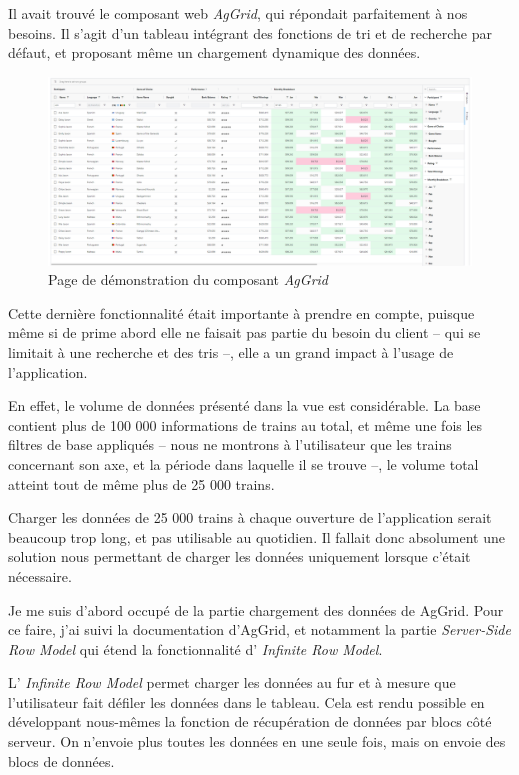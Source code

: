 Il avait trouvé le composant web \textit{AgGrid}\cite{noauthor_ag-grid_nodate-1}, qui répondait parfaitement à nos besoins. Il s'agit d'un tableau intégrant des fonctions de tri et de recherche par défaut, et proposant même un chargement dynamique des données.


  \begin{figure}[H]
    \centering
    \includegraphics[width=1\linewidth]{img/ag-grid-demo.png}
    \caption{Page de démonstration du composant \textit{AgGrid}\cite{noauthor_demo_nodate}}
  \end{figure}

Cette dernière fonctionnalité était importante à prendre en compte, puisque même si de prime abord elle ne faisait pas partie du besoin du client -- qui se limitait à une recherche et des tris --, elle a un grand impact à l'usage de l'application.

En effet, le volume de données présenté dans la vue est considérable. La base contient plus de 100 000 informations de trains au total, et même une fois les filtres de base appliqués -- nous ne montrons à l'utilisateur que les trains concernant son axe, et la période dans laquelle il se trouve --, le volume total atteint tout de même plus de 25 000 trains.

Charger les données de 25 000 trains à chaque ouverture de l'application serait beaucoup trop long, et pas utilisable au quotidien. Il fallait donc absolument une solution nous permettant de charger les données uniquement lorsque c'était nécessaire.

Je me suis d'abord occupé de la partie \og chargement des données \fg de AgGrid. Pour ce faire, j'ai suivi la documentation d'AgGrid, et notamment la partie 
\textit{Server-Side Row Model}\cite{noauthor_server-side_nodate}
qui étend la fonctionnalité d'
\textit{Infinite Row Model}\cite{noauthor_ag-grid_nodate}.

L'
\textit{Infinite Row Model}
permet charger les données au fur et à mesure que l'utilisateur fait défiler les données dans le tableau. Cela est rendu possible en développant nous-mêmes la fonction de récupération de données par blocs côté serveur. On n'envoie plus toutes les données en une seule fois, mais on envoie des blocs de données.

